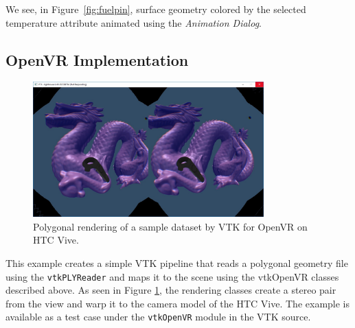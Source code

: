 We see, in Figure~\ref{fig:fuelpin}, surface geometry colored by the selected temperature attribute animated using the \textit{Animation Dialog}.

\subsection{OpenVR Implementation}
\begin{figure}[h!]
  \centering
  \includegraphics[width=3.5in]{images/Dragon.jpg}
  \caption{Polygonal rendering of a sample dataset by VTK for OpenVR on HTC Vive.}
  \label{fig:openvrdragon}
\end{figure}

This example creates a simple VTK pipeline that reads a polygonal geometry file
using the \texttt{vtkPLYReader} and maps it to the scene using the vtkOpenVR
classes described above. As seen in Figure \ref{fig:openvrdragon}, the rendering
classes create a stereo pair from the view and warp it to the camera model of
the HTC Vive. 
The example is available as a test case under the
\texttt{vtkOpenVR} module in the VTK source.
